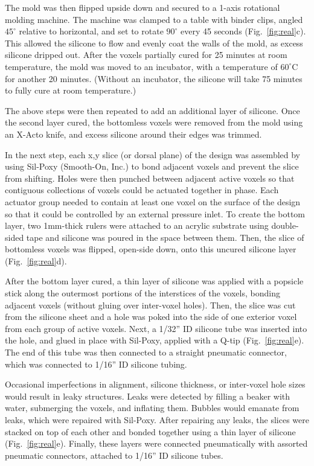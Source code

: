 The mold was then flipped upside down and secured to a 1-axis rotational molding machine. The machine was clamped to a table with binder clips, angled $45^{\circ}$ relative to horizontal, and set to rotate $90^{\circ}$ every 45 seconds (Fig.~\ref{fig:real}c).
This allowed the silicone to flow and evenly coat the walls of the mold, as excess silicone dripped out. 
After the voxels partially cured for 25 minutes at room temperature, the mold was moved to an incubator, with a temperature of $60^{\circ}$C for another 20 minutes. 
(Without an incubator, the silicone will take 75 minutes to fully cure at room temperature.)

The above steps were then repeated to add an additional layer of silicone.
Once the second layer cured, the bottomless voxels were removed from the mold using an X-Acto knife, and excess silicone around their edges was trimmed.

In the next step, each x,y slice (or dorsal plane) of the design was assembled by using Sil-Poxy (Smooth-On, Inc.) to bond adjacent voxels and prevent the slice from shifting.
Holes were then punched between adjacent active voxels so that contiguous collections of voxels could be actuated together in phase.
Each actuator group needed to contain at least one voxel on the surface of the design so that it could be controlled by an external pressure inlet.
To create the bottom layer, two 1mm-thick rulers were attached to an acrylic substrate using double-sided tape and silicone was poured in the space between them. 
Then, the slice of bottomless voxels was flipped, open-side down, onto this uncured silicone layer (Fig.~\ref{fig:real}d). 

After the bottom layer cured, a thin layer of silicone was applied with a popsicle stick along the outermost portions of the interstices of the voxels, bonding adjacent voxels (without gluing over inter-voxel holes).
Then, the slice was cut from the silicone sheet and a hole was poked into the side of one exterior voxel from each group of active voxels.
Next, a 1/32'' ID silicone tube was inserted into the hole, and glued in place with Sil-Poxy, applied with a Q-tip (Fig.~\ref{fig:real}e). 
The end of this tube was then connected to a straight pneumatic connector, which was connected to 1/16'' ID silicone tubing.

Occasional imperfections in alignment, silicone thickness, or inter-voxel hole sizes would result in leaky structures. 
Leaks were detected by filling a beaker with water, submerging the voxels, and inflating them. 
Bubbles would emanate from leaks, which were repaired with Sil-Poxy.
After repairing any leaks, the slices were stacked on top of each other and bonded together using a thin layer of silicone (Fig.~\ref{fig:real}e). 
Finally, these layers were connected pneumatically with assorted pneumatic connectors, attached to 1/16'' ID silicone tubes. 
